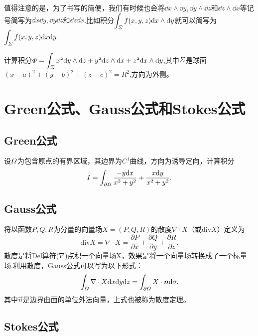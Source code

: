     值得注意的是，为了书写的简便，我们有时候也会将\(\dd x\wedge\dd y,\dd y\wedge\dd z\)和\(\dd z\wedge\dd x\)等记号简写为\(\dd x\dd y,\dd y\dd z\)和\(\dd z\dd x\).比如积分\(\displaystyle\int_{\mit\Sigma}f(x,y,z)\mathrm{d} x\wedge\mathrm{d} y\)就可以简写为\(\displaystyle\int_{\mit\Sigma}f(x,y,z)\mathrm{d} x\mathrm{d} y\).
    \begin{example}
        计算积分\(\displaystyle\mit\Phi=\int_{\mit\Sigma}x^2\mathrm{d}y\wedge\mathrm{d}z+y^2\mathrm{d}z\wedge\mathrm{d}x+z^2\mathrm{d}x\wedge\mathrm{d}y\),其中\(\mit\Sigma\)是球面\((x-a)^2+(y-b)^2+(z-c)^2=R^2\),方向为外侧。
    \end{example}

\section{Green公式、Gauss公式和Stokes公式}
    \subsection{Green公式}
    \begin{example}
        设\(\mit\Omega\)为包含原点的有界区域，其边界为\(C^1\)曲线，方向为诱导定向，计算积分\[I=\int_{\partial\mit\Omega}\frac{-y\mathrm{d} x}{x^2+y^2}+\frac{x\mathrm{d} y}{x^2+y^2}.\]
    \end{example}
    \subsection{Gauss公式}
    \begin{theorem}[Gauss公式]
        
    \end{theorem}
    
    将以函数\(P,Q,R\)为分量的向量场\(X=(P,Q,R)\)的散度\(\nabla\cdot X\)（或\(\mathrm{div}X\)）定义为\[\mathrm{div}X=\nabla\cdot X=\frac{\partial P}{\partial x}+\frac{\partial Q}{\partial y}+\frac{\partial R}{\partial z}.\]
    散度是将Del算符(\(\nabla\))点积一个向量场X，效果是将一个向量场转换成了一个标量场.利用散度，Gauss公式可以写为以下形式：\[\int_{\mit\Omega}\nabla\cdot X\mathrm{d} x\mathrm{d} y\mathrm{d} z=\int_{\partial\mit\Omega}X\cdot\boldsymbol{n}\mathrm{d}\sigma.\]
    其中\(\vec{n}\)是边界曲面的单位外法向量，上式也被称为散度定理。
    \subsection{Stokes公式}